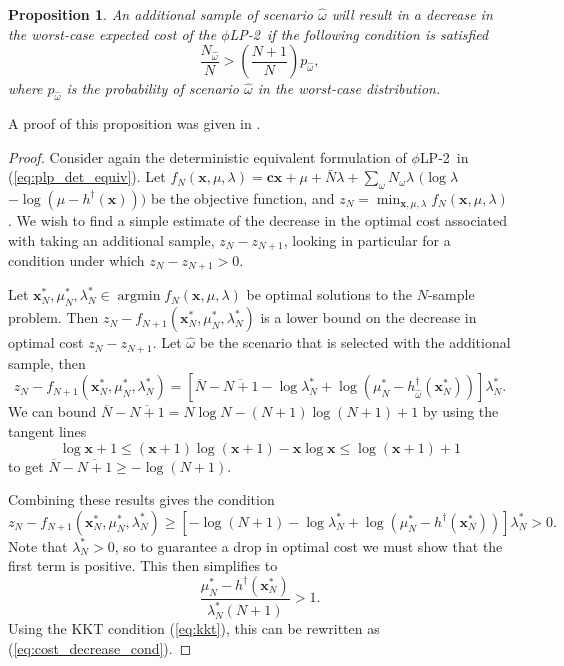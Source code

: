 \documentclass[11pt]{article}
\newcommand{\x}{\mathbf{x}}
\renewcommand{\c}{\mathbf{c}}
\DeclareMathOperator*{\argmin}{argmin}
\newtheorem{proposition}[theorem]{Proposition}
\newcommand{\plp}{$\phi$LP-2}
\begin{document}
\begin{proposition}
	An additional sample of scenario $\hat{\omega}$ will result in a decrease in the worst-case expected cost of the \plp\ if the following condition is satisfied
	\begin{equation} \label{eq:cost_decrease_cond}
		\frac{N_{\hat{\omega}}}{N} > \left( \frac{N+1}{N} \right) p_{\hat{\omega}},
	\end{equation}
	where $p_{\hat{\omega}}$ is the probability of scenario $\hat{\omega}$ in the worst-case distribution.
\end{proposition}

A proof of this proposition was given in \cite{love2013likelihood}.

\begin{proof}
	Consider again the deterministic equivalent formulation of \plp\ in (\ref{eq:plp_det_equiv}).
	Let $f_N(\x,\mu,\lambda) =  \c\x + \mu + \bar{N}\lambda + \sum_\omega N_\omega\lambda$ $(\log\lambda$ $- \log(\mu-h^\dagger(\x)))$ be the objective function, and $z_N = \min_{\x,\mu,\lambda} f_N(\x,\mu,\lambda)$.
	We wish to find a simple estimate of the decrease in the optimal cost associated with taking an additional sample, $z_N - z_{N+1}$, looking in particular for a condition under which $z_N - z_{N+1} > 0$.

	Let $\x^*_N, \mu^*_N,\lambda^*_N \in \argmin f_N(\x,\mu,\lambda)$ be optimal solutions to the $N$-sample problem.
	Then $z_N - f_{N+1}(\x^*_N,\mu^*_N,\lambda^*_N)$ is a lower bound on the decrease in optimal cost $z_N - z_{N+1}$.
	Let $\hat{\omega}$ be the scenario that is selected with the additional sample, then
	\[
		z_N - f_{N+1}(\x^*_N,\mu^*_N,\lambda^*_N) = \left[ \overline{N} - \overline{N+1} - \log \lambda^*_N + \log(\mu^*_N - h^\dagger_{\hat{\omega}}(\x^*_N)) \right] \lambda^*_N.
	\]
	We can bound $\overline{N} - \overline{N+1} = N\log N - (N+1)\log(N+1) + 1$ by using the tangent lines
	\[
		\log \x + 1 \leq (\x+1)\log(\x+1) - \x\log \x \leq \log(\x+1) + 1
	\]
	to get $\overline{N} - \overline{N+1} \geq -\log(N+1)$.

	Combining these results gives the condition
	\[
		z_N - f_{N+1}(\x^*_N,\mu^*_N,\lambda^*_N) \geq \left[ -\log(N+1) - \log\lambda^*_N + \log(\mu^*_N-h^\dagger(\x^*_N))\right]\lambda^*_N > 0.
	\]
	Note that $\lambda^*_N > 0$, so to guarantee a drop in optimal cost we must show that the first term is positive.
	This then simplifies to
	\[
		\frac{\mu^*_N - h^\dagger(\x^*_N)}{\lambda^*_N(N+1)} > 1.
	\]
	Using the KKT condition (\ref{eq:kkt}), this can be rewritten as (\ref{eq:cost_decrease_cond}).
\end{proof}
\end{document}
